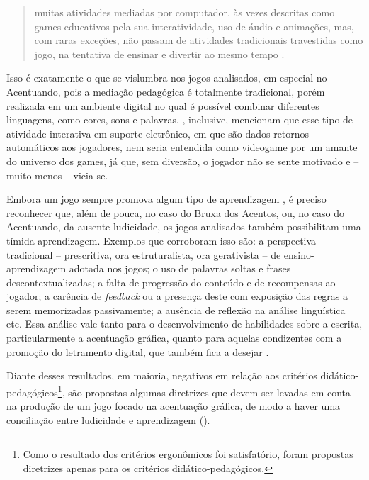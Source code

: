 \documentclass{textolivre}
\begin{document}
\begin{quote}
muitas atividades mediadas por computador, às vezes descritas como games educativos pela sua interatividade, uso de áudio e animações, mas, com raras exceções, não passam de atividades tradicionais travestidas como jogo, na tentativa de ensinar e divertir ao mesmo tempo \cite[p. 224]{leffa2012}.
\end{quote}

Isso é exatamente o que se vislumbra nos jogos analisados, em especial no Acentuando, pois a mediação pedagógica é totalmente tradicional, porém realizada em um ambiente digital no qual é possível combinar diferentes linguagens, como cores, sons e palavras. \textcite{leffa2012}, inclusive, mencionam que esse tipo de atividade interativa em suporte eletrônico, em que são dados retornos automáticos aos jogadores, nem seria entendida como videogame por um amante do universo dos games, já que, sem diversão, o jogador não se sente motivado e – muito menos – vicia-se.

Embora um jogo sempre promova algum tipo de aprendizagem \cite{gee2004, jones2004, ribeiro2016}, é preciso reconhecer que, além de pouca, no caso do Bruxa dos Acentos, ou, no caso do Acentuando, da ausente ludicidade, os jogos  analisados também possibilitam uma tímida aprendizagem. Exemplos que corroboram isso são: a perspectiva tradicional – prescritiva, ora estruturalista, ora gerativista – de ensino-aprendizagem adotada nos jogos; o uso de palavras soltas e frases descontextualizadas; a falta de progressão do conteúdo e de recompensas ao jogador; a carência de \emph{feedback} ou a presença deste com exposição das regras a serem memorizadas passivamente; a ausência de reflexão na análise linguística etc. Essa análise vale tanto para o desenvolvimento de habilidades sobre a escrita, particularmente a acentuação gráfica, quanto para aquelas condizentes com a promoção do letramento digital, que também fica a desejar \cite{ribeiro2014}.

Diante desses resultados, em maioria, negativos em relação aos critérios didático-pedagógicos\footnote{Como o resultado dos critérios ergonômicos foi satisfatório, foram propostas diretrizes apenas para os critérios didático-pedagógicos.}, são propostas algumas diretrizes que devem ser levadas em conta na produção de um jogo focado na acentuação gráfica, de modo a haver uma conciliação entre ludicidade e aprendizagem \cite{leffa2012} ().
\end{document}
